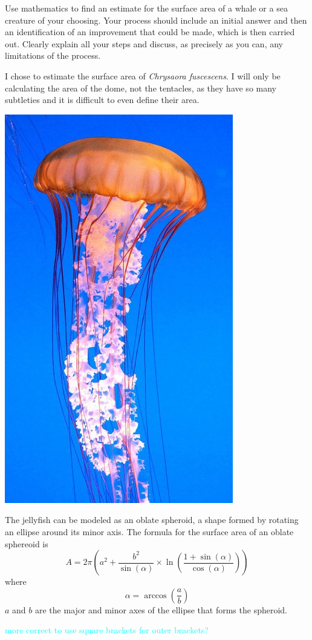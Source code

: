 \documentclass[fleqn]{article}
\newcommand\ask[1]{\textcolor{cyan}{#1}}
\newcommand\chry{\textit{Chrysaora fuscescens}}
\begin{document}
Use mathematics to find an estimate for the surface area of a whale or a sea creature of your choosing. Your process should include an initial answer and then an identification of an improvement that could be made, which is then carried out. Clearly explain all your steps and discuss, as precisely as you can, any limitations of the process.

I chose to estimate the surface area of \chry. I will only be calculating the area of the dome, not the tentacles, as they have so many subtleties and it is difficult to even define their area.

\includegraphics{chrysaora-fuscescens.jpg}

The jellyfish can be modeled as an oblate spheroid, a shape formed by rotating an ellipse around its minor axis. The formula for the surface area of an oblate sphereoid is
\begin{equation*}
  A = 2\pi\left(a^2+\frac{b^2}{\sin(\alpha)}\times\ln\left(\frac{1+\sin(\alpha)}{\cos(\alpha)}\right)\right)
\end{equation*}
where
\begin{equation*}
  \alpha=\arccos\left(\frac{a}{b}\right)
\end{equation*}
$a$ and $b$ are the major and minor axes of the ellipse that forms the spheroid.

\ask{more correct to use square brackets for outer brackets?}
\end{document}

